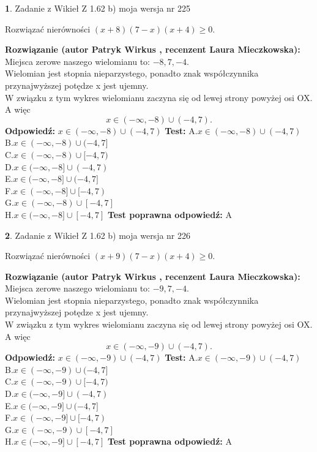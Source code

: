 \documentclass[12pt, a4paper]{article}
\theoremstyle{definition} %
\newtheorem{zad}{}
\newcommand{\zadStart}[1]{\begin{zad}#1\newline}
\newcommand{\zadStop}{\end{zad}}
\newcommand{\rozwStart}[2]{\noindent \textbf{Rozwiązanie (autor #1 , recenzent #2): }\newline}
\newcommand{\rozwStop}{\newline}
\newcommand{\odpStart}{\noindent \textbf{Odpowiedź:}\newline}
\newcommand{\odpStop}{\newline}
\newcommand{\testStart}{\noindent \textbf{Test:}\newline}
\newcommand{\testStop}{\newline}
\newcommand{\kluczStart}{\noindent \textbf{Test poprawna odpowiedź:}\newline}
\newcommand{\kluczStop}{\newline}
\begin{document}
\zadStart{Zadanie z Wikieł Z 1.62 b) moja wersja nr 225}

Rozwiązać nierówności $(x+8)(7-x)(x+4)\ge0$.
\zadStop
\rozwStart{Patryk Wirkus}{Laura Mieczkowska}
Miejsca zerowe naszego wielomianu to: $-8, 7, -4$.\\
Wielomian jest stopnia nieparzystego, ponadto znak współczynnika przy\linebreak najwyższej potędze x jest ujemny.\\ W związku z tym wykres wielomianu zaczyna się od lewej strony powyżej osi OX. A więc $$x \in (-\infty,-8) \cup (-4,7).$$
\rozwStop
\odpStart
$x \in (-\infty,-8) \cup (-4,7)$
\odpStop
\testStart
A.$x \in (-\infty,-8) \cup (-4,7)$\\
B.$x \in (-\infty,-8) \cup (-4,7]$\\
C.$x \in (-\infty,-8) \cup [-4,7)$\\
D.$x \in (-\infty,-8] \cup (-4,7)$\\
E.$x \in (-\infty,-8] \cup (-4,7]$\\
F.$x \in (-\infty,-8] \cup [-4,7)$\\
G.$x \in (-\infty,-8) \cup [-4,7]$\\
H.$x \in (-\infty,-8] \cup [-4,7]$
\testStop
\kluczStart
A
\kluczStop



\zadStart{Zadanie z Wikieł Z 1.62 b) moja wersja nr 226}

Rozwiązać nierówności $(x+9)(7-x)(x+4)\ge0$.
\zadStop
\rozwStart{Patryk Wirkus}{Laura Mieczkowska}
Miejsca zerowe naszego wielomianu to: $-9, 7, -4$.\\
Wielomian jest stopnia nieparzystego, ponadto znak współczynnika przy\linebreak najwyższej potędze x jest ujemny.\\ W związku z tym wykres wielomianu zaczyna się od lewej strony powyżej osi OX. A więc $$x \in (-\infty,-9) \cup (-4,7).$$
\rozwStop
\odpStart
$x \in (-\infty,-9) \cup (-4,7)$
\odpStop
\testStart
A.$x \in (-\infty,-9) \cup (-4,7)$\\
B.$x \in (-\infty,-9) \cup (-4,7]$\\
C.$x \in (-\infty,-9) \cup [-4,7)$\\
D.$x \in (-\infty,-9] \cup (-4,7)$\\
E.$x \in (-\infty,-9] \cup (-4,7]$\\
F.$x \in (-\infty,-9] \cup [-4,7)$\\
G.$x \in (-\infty,-9) \cup [-4,7]$\\
H.$x \in (-\infty,-9] \cup [-4,7]$
\testStop
\kluczStart
A
\kluczStop
\end{document}
